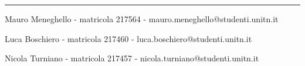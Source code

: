 \documentclass[a4paper,12pt]{article}
\begin{document}
\vspace{15cm}
\hrule
\vspace{0.5cm}


Mauro Meneghello - matricola 217564 - mauro.meneghello@studenti.unitn.it

Luca Boschiero - matricola 217460 -  luca.boschiero@studenti.unitn.it

Nicola Turniano - matricola 217457 - nicola.turniano@studenti.unitn.it

 
\end{document}
